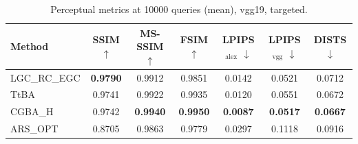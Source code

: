 \begin{table}[t]
\centering\footnotesize
\caption{Perceptual metrics at 10000 queries (mean), vgg19, targeted.}
\begin{tabular}{lcccccc}
\toprule
Method & SSIM $\uparrow$ & MS-SSIM $\uparrow$ & FSIM $\uparrow$ & LPIPS$_{\mathrm{alex}}$ $\downarrow$ & LPIPS$_{\mathrm{vgg}}$ $\downarrow$ & DISTS $\downarrow$ \\
\midrule
LGC\_RC\_EGC & \textbf{0.9790} & 0.9912 & 0.9851 & 0.0142 & 0.0521 & 0.0712 \\
TtBA & 0.9741 & 0.9922 & 0.9935 & 0.0120 & 0.0551 & 0.0672 \\
CGBA\_H & 0.9742 & \textbf{0.9940} & \textbf{0.9950} & \textbf{0.0087} & \textbf{0.0517} & \textbf{0.0667} \\
ARS\_OPT & 0.8705 & 0.9863 & 0.9779 & 0.0297 & 0.1118 & 0.0916 \\
\bottomrule
\end{tabular}
\end{table}

